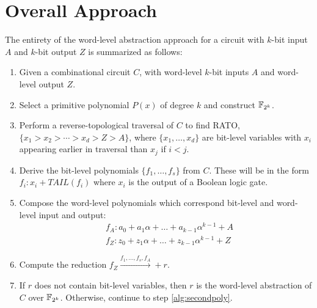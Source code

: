 
\section{Overall Approach}
The entirety of the word-level 
abstraction approach for a circuit with $k$-bit input $A$ and $k$-bit 
output $Z$ is summarized as follows:
\begin{enumerate}
\item Given a combinational circuit $C$, with word-level $k$-bit inputs $A$ and word-level output $Z$.
\item Select a primitive polynomial $P(x)$ of degree $k$ and construct ${\mathbb{F}}_{2^k}$.
\item Perform a reverse-topological traversal of $C$ to find RATO, $\{x_1>x_2>\cdots>x_d>Z>A\}$, where $\{x_1,\dots,x_d\}$ are bit-level variables with $x_i$ appearing earlier in traversal than $x_j$ if $i<j$.
\item Derive the bit-level polynomials $\{f_1,\dots,f_s\}$ from $C$. These will be in the form $f_i:x_i+TAIL(f_i)$ where $x_i$ is the output of a Boolean logic gate.
\item Compose the word-level polynomials which correspond bit-level and word-level input and output:
\begin{eqnarray}
&f_A:a_0+a_1\alpha+\dots+a_{k-1}\alpha^{k-1}+A\\
&f_Z:z_0+z_1\alpha+\dots+z_{k-1}\alpha^{k-1}+Z
\end{eqnarray}
\item \label{alg:initialred}Compute the reduction $f_Z\xrightarrow{f_1,\dots,f_s,f_A}+r$.
\item If $r$ does not contain bit-level variables, then $r$ is the word-level abstraction of $C$ over ${\mathbb{F}}_{2^k}$. Otherwise, continue to step \ref{alg:secondpoly}.

\end{enumerate}
